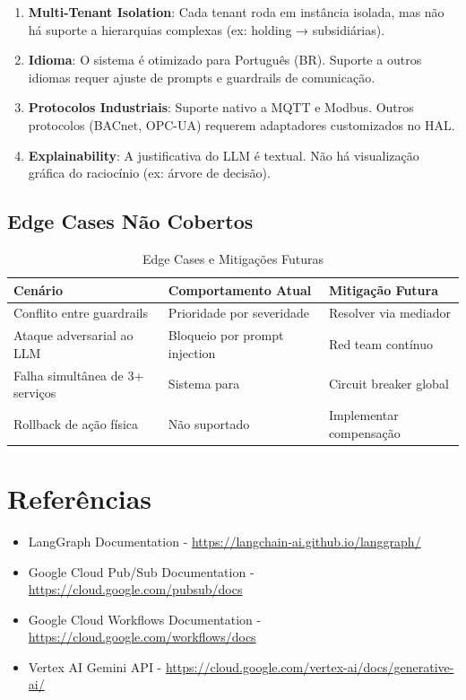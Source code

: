\documentclass[12pt, a4paper]{article}
\begin{document}
\begin{enumerate}
    \item \textbf{Multi-Tenant Isolation}: Cada tenant roda em instância isolada, mas não há suporte a hierarquias complexas (ex: holding → subsidiárias).
    
    \item \textbf{Idioma}: O sistema é otimizado para Português (BR). Suporte a outros idiomas requer ajuste de prompts e guardrails de comunicação.
    
    \item \textbf{Protocolos Industriais}: Suporte nativo a MQTT e Modbus. Outros protocolos (BACnet, OPC-UA) requerem adaptadores customizados no HAL.
    
    \item \textbf{Explainability}: A justificativa do LLM é textual. Não há visualização gráfica do raciocínio (ex: árvore de decisão).
\end{enumerate}

\subsection{Edge Cases Não Cobertos}

\begin{table}[h!]
\centering
\small
\begin{tabular}{|l|l|l|}
\hline
\textbf{Cenário} & \textbf{Comportamento Atual} & \textbf{Mitigação Futura} \\ \hline
Conflito entre guardrails & Prioridade por severidade & Resolver via mediador \\ \hline
Ataque adversarial ao LLM & Bloqueio por prompt injection & Red team contínuo \\ \hline
Falha simultânea de 3+ serviços & Sistema para & Circuit breaker global \\ \hline
Rollback de ação física & Não suportado & Implementar compensação \\ \hline
\end{tabular}
\caption{Edge Cases e Mitigações Futuras}
\end{table}

\newpage

\section{Referências}
\begin{itemize}
    \item LangGraph Documentation - \url{https://langchain-ai.github.io/langgraph/}
    \item Google Cloud Pub/Sub Documentation - \url{https://cloud.google.com/pubsub/docs}
    \item Google Cloud Workflows Documentation - \url{https://cloud.google.com/workflows/docs}
    \item Vertex AI Gemini API - \url{https://cloud.google.com/vertex-ai/docs/generative-ai/}
\end{itemize}
\end{document}
